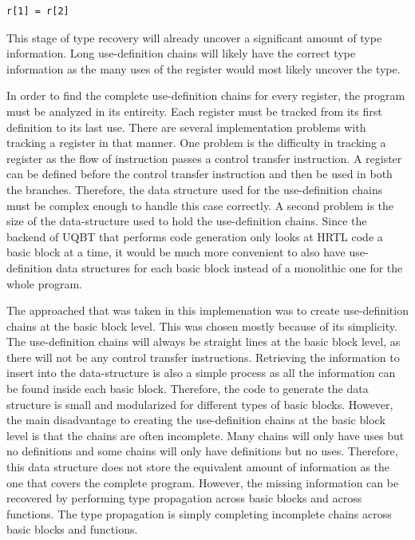 \begin{verbatim}
r[1] = r[2]
\end{verbatim}

This stage of type recovery will already uncover a significant amount of type
information. Long use-definition chains will likely have the correct type
information as the many uses of the register would most likely uncover the
type. 

In order to find the complete use-definition chains for every register, the
program must be analyzed in its entireity. Each register must be tracked 
from its first definition to its last use. There are several implementation
problems with tracking a register in that manner. One problem is the difficulty
in tracking a register as the flow of instruction passes a control transfer
instruction. A register can be defined before the control transfer instruction 
and then be used in both the branches. Therefore, the data structure used for 
the use-definition chains must be complex enough to handle this case correctly.
A second problem is the size of the data-structure used to hold the 
use-definition chains. Since the backend of UQBT that performs code generation 
only looks at HRTL code a basic block at a time, it would be much more 
convenient to also have use-definition data structures for each basic block 
instead of a monolithic one for the whole program. 

The approached that was taken in this implemenation was to create use-definition
chains at the basic block level. This was chosen mostly because of its 
simplicity.  The use-definition chains will always be straight lines at the 
basic block level, as there will not be any control transfer instructions. 
Retrieving the information to insert into the data-structure is also a simple 
process as all the information can be found inside each basic block. 
Therefore, the code to generate the data structure is small and modularized 
for different types of basic blocks. However, the main disadvantage to creating
the use-definition chains at the basic block level is that the chains are 
often incomplete. Many chains will only have uses but no definitions and some 
chains will only have definitions but no uses.
Therefore, this data structure does not store the equivalent amount of 
information as the one that covers the complete program. However, the missing 
information can be recovered by performing type propagation across basic 
blocks and across functions.
The type propagation is simply completing incomplete chains across basic 
blocks and functions. 

